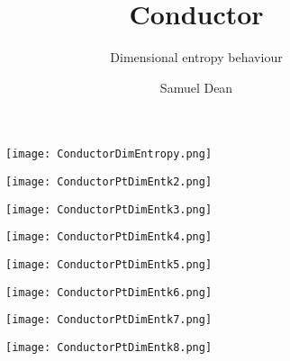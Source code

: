 \documentclass[pdf]{beamer}
\title{\textbf{Conductor}}
\subtitle{Dimensional entropy behaviour}
\author{Samuel Dean}
\begin{document}
\begin{frame}
\titlepage
\end{frame}

\begin{frame}
\begin{figure}[!h]
\centering
\texttt{[image: ConductorDimEntropy.png]}
\end{figure}
\end{frame}

\begin{frame}
\begin{figure}[!h]
\centering
\texttt{[image: ConductorPtDimEntk2.png]}
\end{figure}
\end{frame}

\begin{frame}
\begin{figure}[!h]
\centering
\texttt{[image: ConductorPtDimEntk3.png]}
\end{figure}
\end{frame}

\begin{frame}
\begin{figure}[!h]
\centering
\texttt{[image: ConductorPtDimEntk4.png]}
\end{figure}
\end{frame}

\begin{frame}
\begin{figure}[!h]
\centering
\texttt{[image: ConductorPtDimEntk5.png]}
\end{figure}
\end{frame}

\begin{frame}
\begin{figure}[!h]
\centering
\texttt{[image: ConductorPtDimEntk6.png]}
\end{figure}
\end{frame}

\begin{frame}
\begin{figure}[!h]
\centering
\texttt{[image: ConductorPtDimEntk7.png]}
\end{figure}
\end{frame}

\begin{frame}
\begin{figure}[!h]
\centering
\texttt{[image: ConductorPtDimEntk8.png]}
\end{figure}
\end{frame}
\end{document}
